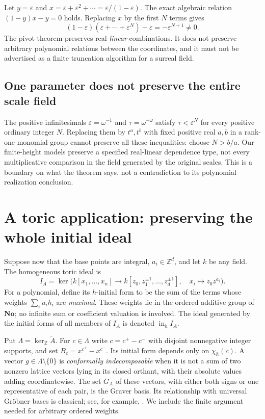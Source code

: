 \documentclass[11pt,a4paper]{article}
\numberwithin{equation}{section}
\theoremstyle{plain}
\newcommand{\No}{\mathbf{No}}
\newcommand{\Z}{\mathbb Z}
\newcommand{\eps}{\varepsilon}
\newcommand{\Atil}{\widetilde A}
\begin{document}
Let $y=\eps$ and $x=\eps+\eps^2+\cdots=\eps/(1-\eps)$.
The exact algebraic relation $(1-y)x-y=0$ holds. Replacing $x$ by the
first $N$ terms gives
\[
 (1-\eps)(\eps+\cdots+\eps^N)-\eps=-\eps^{N+1}\ne0.
\]
The pivot theorem preserves real \emph{linear} combinations. It does not
preserve arbitrary polynomial relations between the coordinates, and it
must not be advertised as a finite truncation algorithm for a surreal field.

\subsection{One parameter does not preserve the entire scale field}\label{poly:sec:oneparam}

The positive infinitesimals
$\eps=\omega^{-1}$ and $\tau=\omega^{-\omega}$ satisfy
$\tau<\eps^N$ for every positive ordinary integer $N$. Replacing them
by $t^a,t^b$ with fixed positive real $a,b$ in a rank-one monomial group
cannot preserve all these inequalities: choose $N>b/a$. Our finite-height
models preserve a specified real-linear dependence type, not every
multiplicative comparison in the field generated by the original scales.
This is a boundary on what the theorem says, not a contradiction to its
polynomial realization conclusion.

\section{A toric application: preserving the whole initial ideal}
\label{poly:sec:toric}

Suppose now that the base points are integral, $a_i\in\Z^d$, and let
$k$ be any field. The homogeneous toric ideal is
\[
 I_A=\ker\bigl(k[x_1,\ldots,x_n]\longrightarrow
                 k[z_0,z_1^{\pm1},\ldots,z_d^{\pm1}],
                 \quad x_i\longmapsto z_0z^{a_i}\bigr).
\]
For a polynomial, define its $h$-initial form to be the sum of the terms
whose weights $\sum_i u_i h_i$ are \emph{maximal}. These weights lie in
the ordered additive group of $\No$; no infinite sum or coefficient
valuation is involved. The ideal generated by the initial forms of all
members of $I_A$ is denoted $\operatorname{in}_h I_A$.

Put $\Lambda=\ker_{\Z}\Atil$. For $c\in\Lambda$ write
$c=c^+-c^-$ with disjoint nonnegative integer supports, and set
$B_c=x^{c^+}-x^{c^-}$. Its initial form depends only on $\chi_h(c)$.
A vector $g\in\Lambda\setminus\{0\}$ is \emph{conformally indecomposable}
when it is not a sum of two nonzero lattice vectors lying in its closed
orthant, with their absolute values adding coordinatewise. The set $G_A$
of these vectors, with either both signs or one representative of each
pair, is the Graver basis. Its relationship with universal Gr\"obner
bases is classical; see, for example, \cite{fs:Petrovic}. We include the
finite argument needed for arbitrary ordered weights.
\end{document}
